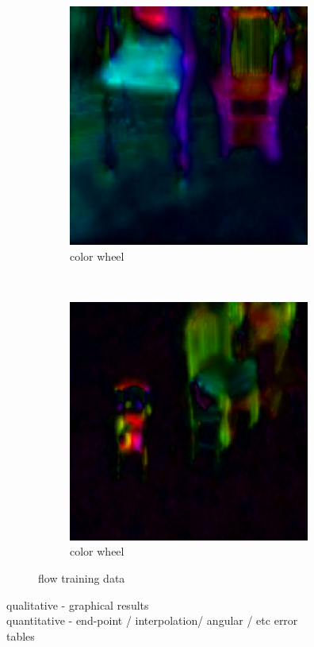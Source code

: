 \begin{figure}[H]
    \begin{subfigure}[t]{0.3\textwidth}
        \centering
        \includegraphics[width=\textwidth]{89-global-step57865}
        \caption{color wheel}
    \end{subfigure}
    ~
    \begin{subfigure}[t]{0.3\textwidth}
        \centering
        \includegraphics[width=\textwidth]{321-global-step57865}
        \caption{color wheel}
    \end{subfigure}
	
\caption{flow training data}
\end{figure}

qualitative - graphical results\\



quantitative - end-point / interpolation/ angular / etc error\\
tables\\

